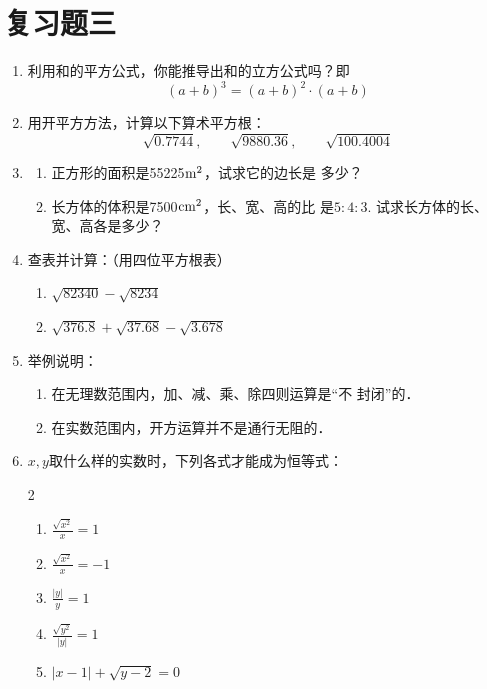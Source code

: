 \section*{复习题三}
\begin{enumerate}
    \item 利用和的平方公式，你能推导出和的立方公式吗？即
    \[(a+b)^3=(a+b)^2\cdot (a+b)\]
    \item 用开平方方法，计算以下算术平方根：
    $$\sqrt{0.7744},\qquad \sqrt{9880.36},\qquad \sqrt{100.4004}$$
  \item 
    \begin{enumerate}
        \item 正方形的面积是55225${\rm m^2}$，试求它的边长是
多少？
\item 长方体的体积是7500${\rm cm^2}$，长、宽、高的比
是$5:4:3$. 试求长方体的长、宽、高各是多少？
    \end{enumerate}
    
    
\item 查表并计算：（用四位平方根表）
\begin{enumerate}
    \item $\sqrt{82340}-\sqrt{8234}$
    \item $\sqrt{376.8}+\sqrt{37.68} -\sqrt{3.678}$
\end{enumerate}

\item 举例说明：
\begin{enumerate}
    \item 在无理数范围内，加、减、乘、除四则运算是“不
封闭”的．
\item 在实数范围内，开方运算并不是通行无阻的．
\end{enumerate}

\item $x,y$取什么样的实数时，下列各式才能成为恒等式：
\begin{multicols}{2}
    \begin{enumerate}
        \item $\frac{\sqrt{x^2}}{x}=1$
        \item $\frac{\sqrt{x^2}}{x}=-1$
        \item $\frac{|y|}{y}=1$
        \item $\frac{\sqrt{y^2}}{|y|}=1$
        \item $|x-1|+\sqrt{y-2}=0$
    \end{enumerate}
\end{multicols}




\end{enumerate}
